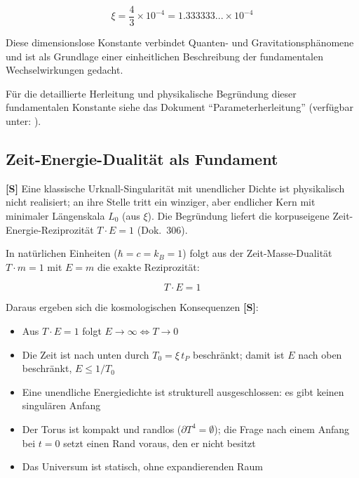 \begin{equation}
	\xi = \frac{4}{3} \times 10^{-4} = 1.333333... \times 10^{-4}
\end{equation}

Diese dimensionslose Konstante verbindet Quanten- und Gravitationsphänomene und ist als Grundlage einer einheitlichen Beschreibung der fundamentalen Wechselwirkungen gedacht.

\begin{tcolorbox}[colback=yellow!10!white,colframe=yellow!50!black,title=Hinweis zur Herleitung]
	Für die detaillierte Herleitung und physikalische Begründung dieser fundamentalen Konstante siehe das Dokument ``Parameterherleitung'' (verfügbar unter: ).
\end{tcolorbox}

	\subsection{Zeit-Energie-Dualität als Fundament}
	
	\begin{revolutionary}[These]
		\textbf{[S]} Eine klassische Urknall-Singularität mit unendlicher Dichte ist physikalisch nicht realisiert; an ihre Stelle tritt ein winziger, aber endlicher Kern mit minimaler Längenskala $L_0$ (aus $\xi$). Die Begründung liefert die korpuseigene Zeit-Energie-Reziprozität $T\cdot E = 1$ (Dok.~306).
	\end{revolutionary}
	
	In natürlichen Einheiten ($\hbar = c = k_B = 1$) folgt aus der Zeit-Masse-Dualität $T \cdot m = 1$ mit $E = m$ die exakte Reziprozität:
	
	\begin{equation}
		T \cdot E = 1
	\end{equation}
	
	Daraus ergeben sich die kosmologischen Konsequenzen \textbf{[S]}:
	\begin{itemize}
		\item Aus $T \cdot E = 1$ folgt $E \to \infty \Leftrightarrow T \to 0$
		\item Die Zeit ist nach unten durch $T_0 = \xi\,t_P$ beschränkt; damit ist $E$ nach oben beschränkt, $E \le 1/T_0$
		\item Eine unendliche Energiedichte ist strukturell ausgeschlossen: es gibt keinen singulären Anfang
		\item Der Torus ist kompakt und randlos ($\partial T^4 = \emptyset$); die Frage nach einem Anfang bei $t = 0$ setzt einen Rand voraus, den er nicht besitzt
		\item Das Universum ist statisch, ohne expandierenden Raum
	\end{itemize}
	
